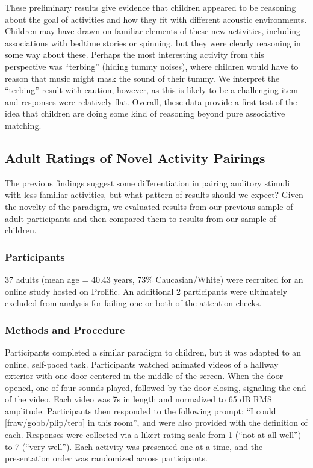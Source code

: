 \documentclass[10pt, letterpaper]{article}
\begin{document}
These preliminary results give evidence that children appeared to be
reasoning about the goal of activities and how they fit with different
acoustic environments. Children may have drawn on familiar elements of
these new activities, including associations with bedtime stories or
spinning, but they were clearly reasoning in some way about these.
Perhaps the most interesting activity from this perspective was
``terbing'' (hiding tummy noises), where children would have to reason
that music might mask the sound of their tummy. We interpret the
``terbing'' result with caution, however, as this is likely to be a
challenging item and responses were relatively flat. Overall, these data
provide a first test of the idea that children are doing some kind of
reasoning beyond pure associative matching.

\hypertarget{adult-ratings-of-novel-activity-pairings}{%
\subsection{Adult Ratings of Novel Activity
Pairings}\label{adult-ratings-of-novel-activity-pairings}}

The previous findings suggest some differentiation in pairing auditory
stimuli with less familiar activities, but what pattern of results
should we expect? Given the novelty of the paradigm, we evaluated
results from our previous sample of adult participants and then compared
them to results from our sample of children.

\hypertarget{participants-2}{%
\subsubsection{Participants}\label{participants-2}}

37 adults (mean age = 40.43 years, 73\% Caucasian/White) were recruited
for an online study hosted on Prolific. An additional 2 participants
were ultimately excluded from analysis for failing one or both of the
attention checks.

\hypertarget{methods-and-procedure}{%
\subsubsection{Methods and Procedure}\label{methods-and-procedure}}

Participants completed a similar paradigm to children, but it was
adapted to an online, self-paced task. Participants watched animated
videos of a hallway exterior with one door centered in the middle of the
screen. When the door opened, one of four sounds played, followed by the
door closing, signaling the end of the video. Each video was 7s in
length and normalized to 65 dB RMS amplitude. Participants then
responded to the following prompt: ``I could {[}fraw/gobb/plip/terb{]}
in this room'', and were also provided with the definition of each.
Responses were collected via a likert rating scale from 1 (``not at all
well'') to 7 (``very well''). Each activity was presented one at a time,
and the presentation order was randomized across participants.
\end{document}
